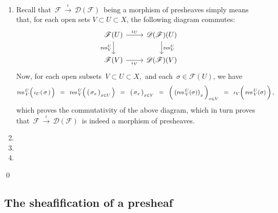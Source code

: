 \proof
\begin{enumerate}
\item
	Recall that 
	\,$\mathscr{F}\,\overset{\iota}{\longrightarrow}\,\mathscr{D}(\mathscr{F})$\,
	being a morphism of presheaves simply means that,
	for each open sets $V \subset U \subset X$, the following diagram commutes:
	\begin{equation*}
	\begin{tikzcd}
	\mathscr{F}(U)  \arrow[r, "\iota_{U}"] \arrow[d, "\res^{U}_{V}"'] & \mathscr{D}(\mathscr{F})(U) \arrow[d, "\res^{U}_{V}"] \\
	\mathscr{F}(V) \arrow[r, "\iota_{V}"'] & \mathscr{D}(\mathscr{F})(V)
	\end{tikzcd}
	\end{equation*}
	Now, for each open subsets \,$V \subset U \subset X$,\, and each \,$\sigma \in \mathscr{F}(U)$,
	we have
	\begin{equation*}
	\res^{\,U}_{\,V}\!\left(\,\overset{{\color{white}.}}{\iota_{U}(\,\sigma\,)}\,\right)
	\;\; = \;\;
		\res^{\,U}_{\,V}\!\left(\,
			\left(\,\overset{{\color{white}.}}{\sigma_{x}}\,\right)_{x \in U}
			\,\right)
	\;\; = \;\;
		\left(\,\overset{{\color{white}.}}{\sigma_{x}}\,\right)_{x \in V}
	\;\; = \;\;
		\left(\,\overset{{\color{white}.}}{\left(\res^{\,U}_{\,V}(\sigma)\right)_{x}}\,\right)_{x \in V}
	\;\; = \;\;
		\iota_{V}\!\left(\,\overset{{\color{white}.}}{\res^{\,U}_{\,V}(\sigma)}\,\right),
	\end{equation*}
	which proves the commutativity of the above diagram, which in turn proves that
	\,$\mathscr{F}\,\overset{\iota}{\longrightarrow}\,\mathscr{D}(\mathscr{F})$\,
	is indeed a morphism of presheaves.
\item
\item
\item
\end{enumerate}
\qed


\subsection{The sheafification of a presheaf}
\setcounter{theorem}{0}
\setcounter{equation}{0}

